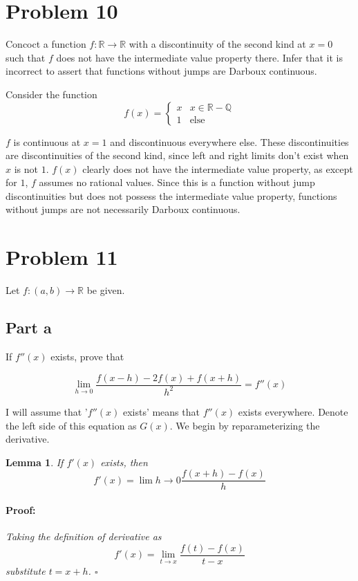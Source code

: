 \documentclass{article}
\newenvironment{proof}{\paragraph{Proof:}}{\hfill$\square$}
\newtheorem{lemma}[theorem]{Lemma}
\newcommand{\R}{\mathbb{R}}
\newcommand{\Q}{\mathbb{Q}}
\begin{document}
\section*{Problem 10}

Concoct a function $f: \R \rightarrow \R$ with a discontinuity of the second kind at $x = 0$ such that $f$ does not have the intermediate value property there. Infer that it is incorrect to assert that functions without jumps are Darboux continuous.

Consider the function
\[
f(x) = 
\begin{cases}
x & x \in \R - \Q \\
1 & \text{else}
\end{cases}
\]

$f$ is continuous at $x=1$ and discontinuous everywhere else. These discontinuities are discontinuities of the second kind, since left and right limits don't exist when $x$ is not $1$. $f(x)$ clearly does not have the intermediate value property, as except for $1$, $f$ assumes no rational values. Since this is a function without jump discontinuities but does not possess the intermediate value property, functions without jumps are not necessarily Darboux continuous.

\section*{Problem 11}

Let $f: (a, b) \rightarrow \R$ be given.

\subsection*{Part a}

If $f''(x)$ exists, prove that

\begin{equation}
\label{SecondDerivativeDiscreteDifference}
\lim_{h \rightarrow 0} \frac{f(x-h) - 2f(x) + f(x+h)}{h^2} = f''(x)
\end{equation}

I will assume that '$f''(x)$ exists' means that $f''(x)$ exists everywhere. Denote the left side of this equation as $G(x)$. We begin by reparameterizing the derivative.

\begin{lemma}
If $f'(x)$ exists, then
\[
f'(x) = \lim{h \rightarrow 0} \frac{f(x+h) - f(x)}{h}
\]
\begin{proof}
Taking the definition of derivative as
\[
f'(x) = \lim_{t \rightarrow x} \frac{f(t) - f(x)}{t-x}
\]
substitute $t = x+h$.
\end{proof}
\end{lemma}
\end{document}
